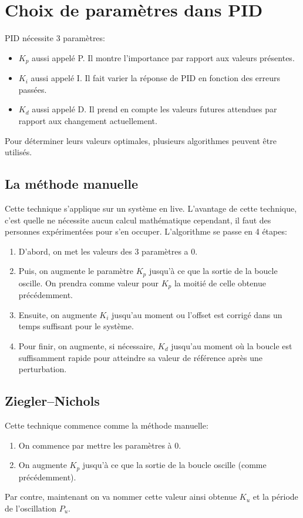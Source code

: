 \section{Choix de paramètres dans PID}
PID nécessite 3 paramètres:
\begin{itemize}
	\item $K_p$ aussi appelé P. Il montre l'importance par rapport aux valeurs présentes.
	\item $K_i$ aussi appelé I. Il fait varier la réponse de PID en fonction des erreurs passées.
	\item $K_d$ aussi appelé D. Il prend en compte les valeurs futures attendues par rapport aux changement actuellement.
\end{itemize}
Pour déterminer leurs valeurs optimales, plusieurs algorithmes peuvent être utilisés.

\subsection{La méthode manuelle}
Cette technique s'applique sur un système en live. L'avantage de cette technique, c'est quelle ne nécessite aucun calcul mathématique cependant, il faut des personnes expérimentées pour s'en occuper.
L'algorithme se passe en 4 étapes:
\begin{enumerate}
	\item D'abord, on met les valeurs des 3 paramètres a 0.
	\item Puis, on augmente le paramètre $K_p$ jusqu'à ce que la sortie de la boucle oscille. On prendra comme valeur pour $K_p$ la moitié de celle obtenue précédemment.
	\item Ensuite, on augmente $K_i$ jusqu'au moment ou l'offset est corrigé dans un temps suffisant pour le système.
	\item Pour finir, on augmente, si nécessaire, $K_d$ jusqu'au moment où la boucle est suffisamment rapide pour atteindre sa valeur de référence après une perturbation.
\end{enumerate}

\subsection{Ziegler–Nichols}
Cette technique commence comme la méthode manuelle:
\begin{enumerate}
	\item On commence par mettre les paramètres à 0.
	\item On augmente $K_p$ jusqu'à ce que la sortie de la boucle oscille (comme précédemment).
\end{enumerate}
Par contre, maintenant on va nommer cette valeur ainsi obtenue $K_u$ et la période de l'oscillation $P_u$.

